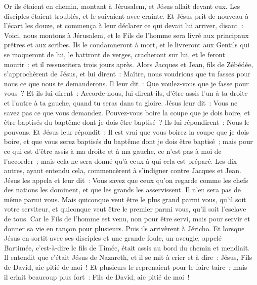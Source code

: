 \begin{multicols}{2}
Or ils étaient en chemin, montant à Jérusalem, et Jésus allait devant eux. Les disciples étaient troublés, et le suivaient avec crainte. Et Jésus prit de nouveau à l'écart les douze, et commença à leur déclarer ce qui devait lui arriver,
disant~: Voici, nous montons à Jérusalem, et le Fils de l'homme sera livré aux principaux prêtres et aux scribes. Ils le condamneront à mort, et le livreront aux Gentils
qui se moqueront de lui, le battront de verges, cracheront sur lui, et le feront mourir~; et il ressuscitera trois jours après.
Alors Jacques et Jean, fils de Zébédée, s'approchèrent de Jésus, et lui dirent~: Maître, nous voudrions que tu fasses pour nous ce que nous te demanderons.
Il leur dit~: Que voulez-vous que je fasse pour vous~?
Et ils lui dirent~: Accorde-nous, lui dirent-ils, d'être assis l'un à ta droite et l'autre à ta gauche, quand tu seras dans ta gloire.
Jésus leur dit~: Vous ne savez pas ce que vous demandez. Pouvez-vous boire la coupe que je dois boire, et être baptisés du baptême dont je dois être baptisé~?
Ils lui répondirent~: Nous le pouvons. Et Jésus leur répondit~: Il est vrai que vous boirez la coupe que je dois boire, et que vous serez baptisés du baptême dont je dois être baptisé~;
mais pour ce qui est d'être assis à ma droite et à ma gauche, ce n'est pas à moi de l'accorder~; mais cela ne sera donné qu'à ceux à qui cela est préparé.
Les dix autres, ayant entendu cela, commencèrent à s'indigner contre Jacques et Jean.
Jésus les appela et leur dit~: Vous savez que ceux qu'on regarde comme les chefs des nations les dominent, et que les grands les asservissent.
Il n'en sera pas de même parmi vous. Mais quiconque veut être le plus grand parmi vous, qu'il soit votre serviteur,
et quiconque veut être le premier parmi vous, qu'il soit l'esclave de tous.
Car le Fils de l'homme est venu, non pour être servi, mais pour servir et donner sa vie en rançon pour plusieurs.
Puis ils arrivèrent à Jéricho. Et lorsque Jésus en sortit avec ses disciples et une grande foule, un aveugle, appelé Bartimée, c'est-à-dire le fils de Timée, était assis au bord du chemin et mendiait.
Il entendit que c'était Jésus de Nazareth, et il se mit à crier et à dire~: Jésus, Fils de David, aie pitié de moi~!
Et plusieurs le reprenaient pour le faire taire~; mais il criait beaucoup plus fort~: Fils de David, aie pitié de moi~!

\end{multicols}
